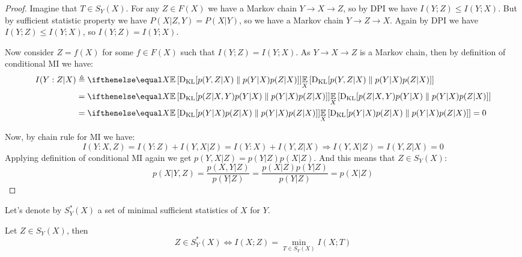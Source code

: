 \documentclass{article}
\begin{document}
\begin{proof}
Imagine that $T \in S_Y(X)$.
For any $Z \in F(X)$ we have a Markov chain $Y \to X \to Z$, so by DPI we have $I(Y;Z) \leq I(Y;X)$.
But by sufficient statistic property we have $P(X|Z,Y) = P(X|Y)$, so we have a Markov chain $Y \to Z \to X$.
Again by DPI we have $I(Y;Z) \leq I(Y;X)$, so $I(Y;Z) = I(Y;X)$.

Now consider $Z = f(X)$ for some $f \in F(X)$ such that $I(Y;Z) = I(Y;X)$.
As $Y \to X \to Z$ is a Markov chain, then by definition of conditional MI we have:
\[
\begin{split}
I(Y:Z|X) &\triangleq \expect[X]{\kl{p(Y,Z|X)}{p(Y|X)p(Z|X)}} \\
&= \expect[X]{\kl{p(Z|X,Y)p(Y|X)}{p(Y|X)p(Z|X)}} \\
&= \expect[X]{\kl{p(Y|X)p(Z|X)}{p(Y|X)p(Z|X)}} = 0
\end{split}
\]

Now, by chain rule for MI we have:
\[
I(Y : X,Z) = I(Y : Z) + I(Y,X|Z) = I(Y : X) + I(Y,Z|X) \Longrightarrow I(Y,X|Z) = I(Y,Z|X) = 0
\]
Applying definition of conditional MI again we get $p(Y,X|Z) = p(Y|Z)p(X|Z)$.
And this means that $Z \in S_Y(X)$:
\[
p(X|Y,Z) = \frac{p(X,Y|Z)}{p(Y|Z)} = \frac{p(X|Z) p(Y|Z)}{p(Y|Z)} = p(X|Z)
\]
\end{proof}

Let's denote by $S_Y^*(X)$ a set of minimal sufficient statistics of $X$ for $Y$.
\begin{lemma}
Let $Z \in S_Y(X)$, then
\[
Z \in S_Y^*(X) \Longleftrightarrow I(X;Z) = \min_{T \in S_Y(X)} I(X;T)
\]
\end{lemma}
\end{document}
